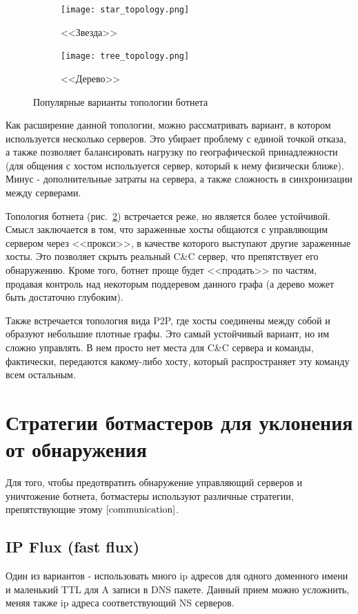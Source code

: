 \documentclass[a4paper,14pt]{extreport} %
\begin{document}
\begin{figure}[H]
				
	\begin{subfigure}{0.5\textwidth}
		\texttt{[image: star\_topology.png]}
		\caption{<<Звезда>>}
		\label{fig:top1}
	\end{subfigure}
	\begin{subfigure}{0.5\textwidth}
		\texttt{[image: tree\_topology.png]}
		\caption{<<Дерево>>}
		\label{fig:top2}
	\end{subfigure}
				 
	\caption{Популярные варианты топологии ботнета}
	\label{fig:image2}
\end{figure}
Как расширение данной топологии, можно рассматривать вариант, в котором используется несколько серверов. Это убирает проблему с единой точкой отказа, а также позволяет балансировать нагрузку по географической принадлежности (для общения с хостом используется сервер, который к нему физически ближе). Минус - дополнительные затраты на сервера, а также сложность в синхронизации между серверами.
	
Топология ботнета (рис.~\ref{fig:top2}) встречается реже, но является более устойчивой. Смысл заключается в том, что зараженные хосты общаются с управляющим сервером через <<прокси>>, в качестве которого выступают другие зараженные хосты. Это позволяет скрыть реальный C\&C сервер, что препятствует его обнаружению. Кроме того, ботнет проще будет <<продать>> по частям, продавая контроль над некоторым поддеревом данного графа (а дерево может быть достаточно глубоким).
	
Также встречается топология вида P2P, где хосты соединены между собой и образуют небольшие плотные графы. Это самый устойчивый вариант, но им сложно управлять. В нем просто нет места для C\&C сервера и команды, фактически, передаются какому-либо хосту, который распространяет эту команду всем остальным.

\section{Стратегии ботмастеров для уклонения от обнаружения}
Для того, чтобы предотвратить обнаружение управляющий серверов и уничтожение ботнета, ботмастеры используют различные стратегии, препятствующие этому $\cite{communication}$.
\subsection{IP Flux (fast flux)}
Один из вариантов - использовать много ip адресов для одного доменного имени и маленький TTL для A записи в DNS пакете. Данный прием можно усложнить, меняя также ip адреса соответствующий NS серверов.
	
\end{document}
